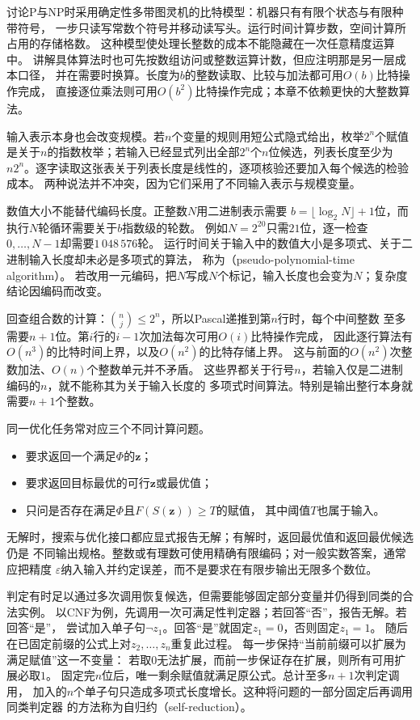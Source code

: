 讨论P与NP时采用确定性多带图灵机的比特模型：机器只有有限个状态与有限种带符号，
一步只读写常数个符号并移动读写头。运行时间计算步数，空间计算所占用的存储格数。
这种模型使处理长整数的成本不能隐藏在一次任意精度运算中。
讲解具体算法时也可先按数组访问或整数运算计数，但应注明那是另一层成本口径，
并在需要时换算。长度为$b$的整数读取、比较与加法都可用$O(b)$比特操作完成，
直接逐位乘法则可用$O(b^2)$比特操作完成；本章不依赖更快的大整数算法。

输入表示本身也会改变规模。若$n$个变量的规则用短公式隐式给出，枚举$2^n$个赋值
是关于$n$的指数枚举；若输入已经显式列出全部$2^n$个$n$位候选，列表长度至少为
$n2^n$。逐字读取这张表关于列表长度是线性的，逐项核验还要加入每个候选的检验成本。
两种说法并不冲突，因为它们采用了不同输入表示与规模变量。

数值大小不能替代编码长度。正整数$N$用二进制表示需要
$b=\lfloor\log_2N\rfloor+1$位，而执行$N$轮循环需要关于$b$指数级的轮数。
例如$N=2^{20}$只需$21$位，逐一检查$0,\ldots,N-1$却需要$1\,048\,576$轮。
运行时间关于输入中的数值大小是多项式、关于二进制输入长度却未必是多项式的算法，
称为（pseudo-polynomial-time algorithm）。
若改用一元编码，把$N$写成$N$个标记，输入长度也会变为$N$；复杂度结论因编码而改变。

回查组合数的计算：$\binom nj\leq2^n$，所以Pascal递推到第$n$行时，每个中间整数
至多需要$n+1$位。第$i$行的$i-1$次加法每次可用$O(i)$比特操作完成，
因此逐行算法有$O(n^3)$的比特时间上界，以及$O(n^2)$的比特存储上界。
这与前面的$O(n^2)$次整数加法、$O(n)$个整数单元并不矛盾。
这些界都关于行号$n$，若输入仅是二进制编码的$n$，就不能称其为关于输入长度的
多项式时间算法。特别是输出整行本身就需要$n+1$个整数。

同一优化任务常对应三个不同计算问题。
\begin{itemize}
  \item {}要求返回一个满足$\Phi$的$\bm{z}$；
  \item {}要求返回目标最优的可行$\bm{z}$或最优值；
  \item {}只问是否存在满足$\Phi$且$F(S(\bm{z}))\geq T$的赋值，
  其中阈值$T$也属于输入。
\end{itemize}
无解时，搜索与优化接口都应显式报告无解；有解时，返回最优值和返回最优候选仍是
不同输出规格。整数或有理数可使用精确有限编码；对一般实数答案，通常应把精度
$\varepsilon$纳入输入并约定误差，而不是要求在有限步输出无限多个数位。

判定有时足以通过多次调用恢复候选，但需要能够固定部分变量并仍得到同类的合法实例。
以CNF为例，先调用一次可满足性判定器；若回答“否”，报告无解。若回答“是”，
尝试加入单子句$\neg z_1$。回答“是”就固定$z_1=0$，否则固定$z_1=1$。
随后在已固定前缀的公式上对$z_2,\ldots,z_n$重复此过程。
每一步保持“当前前缀可以扩展为满足赋值”这一不变量：
若取$0$无法扩展，而前一步保证存在扩展，则所有可用扩展必取$1$。
固定完$n$位后，唯一剩余赋值就满足原公式。总计至多$n+1$次判定调用，
加入的$n$个单子句只造成多项式长度增长。这种将问题的一部分固定后再调用同类判定器
的方法称为自归约（self-reduction）。

